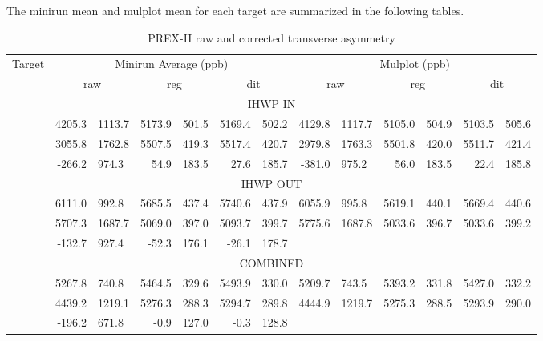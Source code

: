 The minirun mean and mulplot mean for each target are summarized in the following
tables.
\begin{table}[!h]
    \scriptsize
    \begin{tabular}{c | r@{ $\pm$ }l r@{ $\pm$ }l r@{ $\pm$ }l | r@{ $\pm$ }l r@{ $\pm$ }l r@{ $\pm$ }l}
	\hline
	\multirow{2}{*}{Target}	& \multicolumn{6}{c|}{Minirun Average (ppb)} & \multicolumn{6}{c}{Mulplot (ppb)}	\\
	\cline{2-13}
	    & \multicolumn{2}{c}{raw}   & \multicolumn{2}{c}{reg}	& \multicolumn{2}{c|}{dit}   & \multicolumn{2}{c}{raw}	& \multicolumn{2}{c}{reg}   & \multicolumn{2}{c}{dit}	\\
	\hline
	\multicolumn{13}{c}{IHWP IN}   \\
	\hline
	\Carbon	& 4205.3	& 1113.7    & 5173.9	& 501.5	    & 5169.4	& 502.2	    & 4129.8  & 1117.7    & 5105.0  & 504.9     & 5103.5  & 505.6   \\ 
	\ca	& 3055.8	& 1762.8    & 5507.5	& 419.3     & 5517.4	& 420.7	    & 2979.8  & 1763.3    & 5501.8  & 420.0     & 5511.7  & 421.4   \\   
	\Pb	& -266.2	& 974.3     & 54.9  	& 183.5     & 27.6  	& 185.7	    & -381.0  & 975.2     & 56.0   & 183.5	& 22.4    & 185.8   \\   
	\hline
	\multicolumn{13}{c}{IHWP OUT}   \\
	\hline
	\Carbon	& 6111.0	& 992.8	    & 5685.5	& 437.4	    & 5740.6	& 437.9	    & 6055.9  & 995.8     & 5619.1  & 440.1     & 5669.4  & 440.6   \\ 
	\ca	& 5707.3	& 1687.7    & 5069.0	& 397.0     & 5093.7	& 399.7	    & 5775.6  & 1687.8    & 5033.6  & 396.7     & 5033.6  & 399.2   \\   
	\Pb	& -132.7	& 927.4     & -52.3 	& 176.1     & -26.1 	& 178.7	    & \multicolumn{6}{c}{\color{red}{data can't be reproduced due to lost of run 4112}}	\\   
	\hline
	\multicolumn{13}{c}{COMBINED}   \\
	\hline
	\Carbon	& 5267.8	& 740.8	    & 5464.5	& 329.6	    & 5493.9	& 330.0	    & 5209.7  & 743.5     & 5393.2  & 331.8     & 5427.0  & 332.2   \\ 
	\ca	& 4439.2	& 1219.1    & 5276.3	& 288.3     & 5294.7	& 289.8	    & 4444.9  & 1219.7    & 5275.3  & 288.5     & 5293.9  & 290.0   \\   
	\Pb	& -196.2	& 671.8     & -0.9  	& 127.0     & -0.3  	& 128.8	    & \multicolumn{6}{c}{\color{red}{data can't be reproduced due to lost of run 4112}}  \\   
	\hline
    \end{tabular}
    \caption{PREX-II raw and corrected transverse asymmetry}
\end{table}

